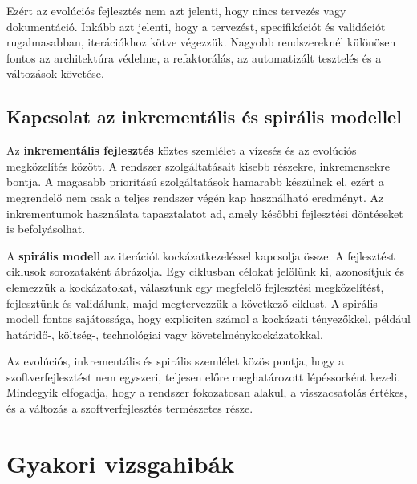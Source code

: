 Ezért az evolúciós fejlesztés nem azt jelenti, hogy nincs tervezés vagy dokumentáció. Inkább azt jelenti, hogy a tervezést, specifikációt és validációt rugalmasabban, iterációkhoz kötve végezzük. Nagyobb rendszereknél különösen fontos az architektúra védelme, a refaktorálás, az automatizált tesztelés és a változások követése.

\subsection{Kapcsolat az inkrementális és spirális modellel}

Az \textbf{inkrementális fejlesztés} köztes szemlélet a vízesés és az evolúciós megközelítés között. A rendszer szolgáltatásait kisebb részekre, inkremensekre bontja. A magasabb prioritású szolgáltatások hamarabb készülnek el, ezért a megrendelő nem csak a teljes rendszer végén kap használható eredményt. Az inkrementumok használata tapasztalatot ad, amely későbbi fejlesztési döntéseket is befolyásolhat.

A \textbf{spirális modell} az iterációt kockázatkezeléssel kapcsolja össze. A fejlesztést ciklusok sorozataként ábrázolja. Egy ciklusban célokat jelölünk ki, azonosítjuk és elemezzük a kockázatokat, választunk egy megfelelő fejlesztési megközelítést, fejlesztünk és validálunk, majd megtervezzük a következő ciklust. A spirális modell fontos sajátossága, hogy expliciten számol a kockázati tényezőkkel, például határidő-, költség-, technológiai vagy követelménykockázatokkal.

Az evolúciós, inkrementális és spirális szemlélet közös pontja, hogy a szoftverfejlesztést nem egyszeri, teljesen előre meghatározott lépéssorként kezeli. Mindegyik elfogadja, hogy a rendszer fokozatosan alakul, a visszacsatolás értékes, és a változás a szoftverfejlesztés természetes része.

\section{Gyakori vizsgahibák}

